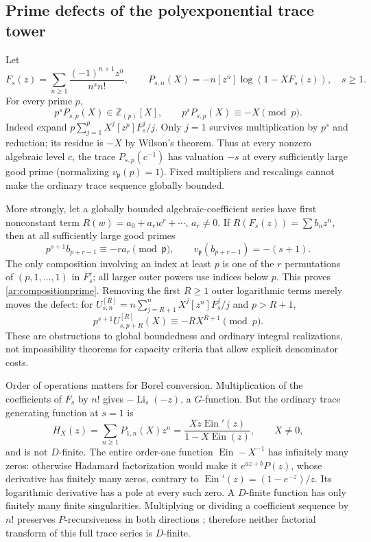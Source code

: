 \documentclass[11pt,a4paper]{article}
\newcommand{\Z}{\mathbb Z}
\newcommand{\Ein}{\operatorname{Ein}}
\theoremstyle{definition}
\theoremstyle{remark}
\numberwithin{equation}{section}
\begin{document}
\subsection{Prime defects of the polyexponential trace tower}
Let
\[
 F_s(z)=\sum_{n\ge1}\frac{(-1)^{n+1}z^n}{n^s n!},\qquad
 P_{s,n}(X)=-n[z^n]\log(1-XF_s(z)),\quad s\ge1.
\]
For every prime $p$,
\begin{equation}\label{ar:traceprime}
 p^sP_{s,p}(X)\in\Z_{(p)}[X],\qquad
 p^sP_{s,p}(X)\equiv-X\pmod p.
\end{equation}
Indeed expand $p\sum_{j=1}^pX^j[z^p]F_s^j/j$.  Only $j=1$ survives
multiplication by $p^s$ and reduction; its residue is $-X$ by Wilson's
theorem.  Thus at every nonzero algebraic level $c$, the trace
$P_{s,p}(c^{-1})$ has valuation $-s$ at every sufficiently large good prime
(normalizing $v_{\mathfrak p}(p)=1$).  Fixed multipliers and rescalings
cannot make the ordinary trace sequence globally bounded.

More strongly, let a globally bounded algebraic-coefficient series have
first nonconstant term $R(w)=a_0+a_rw^r+\cdots$, $a_r\ne0$.
If $R(F_s(z))=\sum b_nz^n$, then at all sufficiently large good primes
\begin{equation}\label{ar:compositionprime}
 p^{s+1}b_{p+r-1}\equiv-ra_r\pmod{\mathfrak p},\qquad
 v_{\mathfrak p}(b_{p+r-1})=-(s+1).
\end{equation}
The only composition involving an index at least $p$ is one of the $r$
permutations of $(p,1,\ldots,1)$ in $F_s^r$; all larger outer powers use
indices below $p$.  This proves \eqref{ar:compositionprime}.
Removing the first $R\ge1$ outer logarithmic terms merely moves the defect:
for $U_{s,n}^{[R]}=n\sum_{j=R+1}^nX^j[z^n]F_s^j/j$ and $p>R+1$,
\[
 p^{s+1}U_{s,p+R}^{[R]}(X)\equiv-RX^{R+1}\pmod p.
\]
These are obstructions to global boundedness and ordinary integral
realizations, not impossibility theorems for capacity criteria that allow
explicit denominator costs.

Order of operations matters for Borel conversion.  Multiplication of the
coefficients of $F_s$ by $n!$ gives $-\operatorname{Li}_s(-z)$, a
$G$-function.  But the ordinary trace generating function at $s=1$ is
\[
 H_X(z)=\sum_{n\ge1}P_{1,n}(X)z^n
       =\frac{Xz\Ein'(z)}{1-X\Ein(z)},\qquad X\ne0,
\]
and is not $D$-finite.  The entire order-one function $\Ein-X^{-1}$ has
infinitely many zeros: otherwise Hadamard factorization would make it
$e^{az+b}P(z)$, whose derivative has finitely many zeros, contrary to
$\Ein'(z)=(1-e^{-z})/z$.  Its logarithmic derivative has a pole at every
such zero.  A $D$-finite function has only finitely many finite
singularities.  Multiplying or dividing a coefficient sequence by $n!$
preserves $P$-recursiveness in both directions \cite{ar:Stanley}; therefore
neither factorial transform of this full trace series is $D$-finite.
\end{document}
